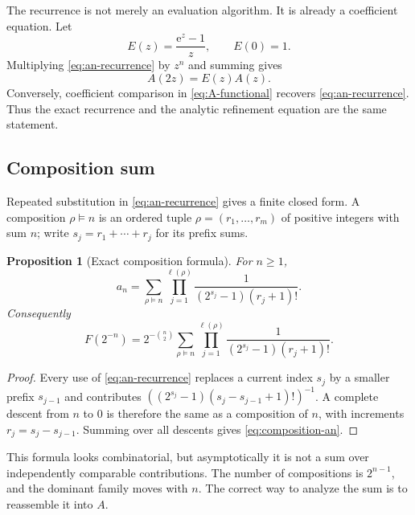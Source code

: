 \documentclass[11pt,oneside]{article}
\newtheorem{proposition}[theorem]{Proposition}
\theoremstyle{definition}
\theoremstyle{remark}
\newcommand{\e}{\mathrm e}
\begin{document}
The recurrence is not merely an evaluation algorithm.  It is already a coefficient equation.
Let
\begin{equation}
 E(z)=\frac{\e^z-1}{z},\qquad E(0)=1.                       \label{eq:E}
\end{equation}
Multiplying \eqref{eq:an-recurrence} by $z^n$ and summing gives
\begin{equation}
 \boxed{A(2z)=E(z)A(z).}                                    \label{eq:A-functional}
\end{equation}
Conversely, coefficient comparison in \eqref{eq:A-functional} recovers
\eqref{eq:an-recurrence}.  Thus the exact recurrence and the analytic refinement equation are
the same statement.

\subsection{Composition sum}

Repeated substitution in \eqref{eq:an-recurrence} gives a finite closed form.  A composition
$\rho\vDash n$ is an ordered tuple $\rho=(r_1,\ldots,r_m)$ of positive integers with sum
$n$; write $s_j=r_1+\cdots+r_j$ for its prefix sums.

\begin{proposition}[Exact composition formula]
\label{prop:composition}
For $n\ge1$,
\begin{equation}
 a_n=
 \sum_{\rho\vDash n}
 \prod_{j=1}^{\ell(\rho)}
 \frac{1}{(2^{s_j}-1)(r_j+1)!}.                             \label{eq:composition-an}
\end{equation}
Consequently
\begin{equation}
 F(2^{-n})=2^{-\binom n2}
 \sum_{\rho\vDash n}
 \prod_{j=1}^{\ell(\rho)}
 \frac{1}{(2^{s_j}-1)(r_j+1)!}.                             \label{eq:composition-F}
\end{equation}
\end{proposition}

\begin{proof}
Every use of \eqref{eq:an-recurrence} replaces a current index $s_j$ by a smaller prefix
$s_{j-1}$ and contributes
$((2^{s_j}-1)(s_j-s_{j-1}+1)!)^{-1}$.  A complete descent from $n$ to $0$ is therefore the
same as a composition of $n$, with increments $r_j=s_j-s_{j-1}$.  Summing over all descents
gives \eqref{eq:composition-an}.
\end{proof}

This formula looks combinatorial, but asymptotically it is not a sum over independently
comparable contributions.  The number of compositions is $2^{n-1}$, and the dominant family
moves with $n$.  The correct way to analyze the sum is to reassemble it into $A$.
\end{document}
